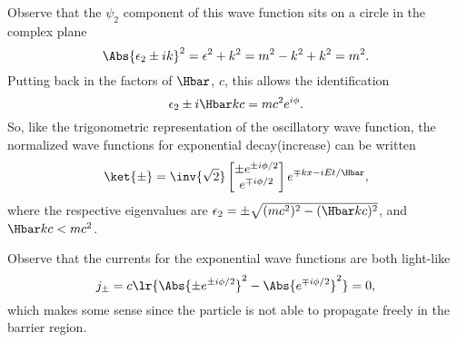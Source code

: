 \begin{enumerate}[(i)]
Observe that the \( \psi_2 \) component of this wave function sits on a circle in the complex plane
%
\begin{dmath}\label{eqn:gradQuantumProblemSet4Problem3:1101}
\Abs{\epsilon_2 \pm i k}^2
= \epsilon^2 + k^2
= m^2 - k^2 + k^2
= m^2.
\end{dmath}
%
Putting back in the factors of \( \Hbar \), \( c\), this allows the identification
%
\begin{equation}\label{eqn:gradQuantumProblemSet4Problem3:1121}
\epsilon_2 \pm i \Hbar k c = m c^2 e^{i\phi}.
\end{equation}
%
So, like the trigonometric representation of the oscillatory wave function, the normalized wave functions for exponential decay(increase) can be written
%
\begin{equation}\label{eqn:gradQuantumProblemSet4Problem3:1141}
\ket{\pm}
=
\inv{\sqrt{2}}
\begin{bmatrix}
\pm e^{\pm i \phi/2} \\
e^{\mp i \phi/2}
\end{bmatrix}
e^{\mp k x - i E t/\Hbar}
,
\end{equation}
%
where the respective eigenvalues are \( \epsilon_2 = \pm \sqrt{ (m c^2)^2 - (\Hbar k c)^2} \), and \( \Hbar k c < m c^2 \).

Observe that the currents for the exponential wave functions are both light-like
%
\begin{equation}\label{eqn:gradQuantumProblemSet4Problem3:1161}
j_{\pm} = c \lr{ \Abs{\pm e^{\pm i \phi/2}}^2 - \Abs{e^{\mp i \phi/2}}^2 } = 0,
\end{equation}
%
which makes some sense since the particle is not able to propagate freely in the barrier region.


\end{enumerate}
